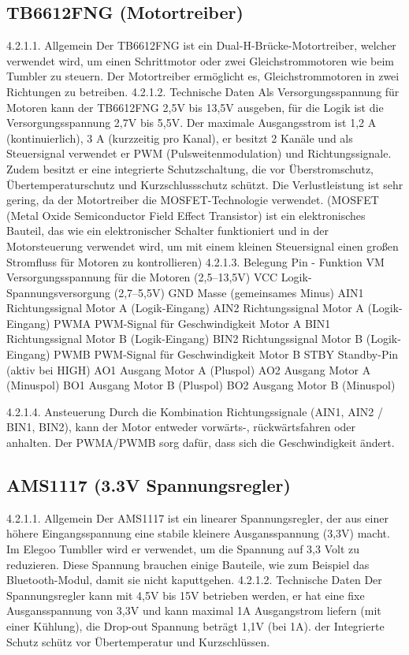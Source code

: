 \subsection{TB6612FNG (Motortreiber)}
%
4.2.1.1. Allgemein
Der TB6612FNG ist ein Dual-H-Brücke-Motortreiber, welcher verwendet wird, um einen Schrittmotor oder zwei Gleichstrommotoren wie beim Tumbler zu steuern. Der Motortreiber ermöglicht es, Gleichstrommotoren in zwei Richtungen zu betreiben.
4.2.1.2. Technische Daten
Als Versorgungsspannung für Motoren kann der TB6612FNG 2,5V bis 13,5V ausgeben, für die Logik ist die Versorgungsspannung 2,7V bis 5,5V. Der maximale Ausgangsstrom ist 1,2 A (kontinuierlich), 3 A (kurzzeitig pro Kanal), er besitzt 2 Kanäle und als Steuersignal verwendet er PWM (Pulsweitenmodulation) und Richtungssignale. Zudem besitzt er eine integrierte Schutzschaltung, die vor Überstromschutz, Übertemperaturschutz und Kurzschlussschutz schützt. Die Verlustleistung ist sehr gering, da der Motortreiber die MOSFET-Technologie verwendet. (MOSFET (Metal Oxide Semiconductor Field Effect Transistor) ist ein elektronisches Bauteil, das wie ein elektronischer Schalter funktioniert und in der Motorsteuerung verwendet wird, um mit einem kleinen Steuersignal einen großen Stromfluss für Motoren zu kontrollieren)
4.2.1.3. Belegung
Pin	-	Funktion
VM	Versorgungsspannung für die Motoren (2,5–13,5V)
VCC	Logik-Spannungsversorgung (2,7–5,5V)
GND	Masse (gemeinsames Minus)
AIN1	Richtungssignal Motor A (Logik-Eingang)
AIN2	Richtungssignal Motor A (Logik-Eingang)
PWMA	PWM-Signal für Geschwindigkeit Motor A
BIN1	Richtungssignal Motor B (Logik-Eingang)
BIN2	Richtungssignal Motor B (Logik-Eingang)
PWMB	PWM-Signal für Geschwindigkeit Motor B
STBY	Standby-Pin (aktiv bei HIGH)
AO1	Ausgang Motor A (Pluspol)
AO2	Ausgang Motor A (Minuspol)
BO1	Ausgang Motor B (Pluspol)
BO2	Ausgang Motor B (Minuspol)

4.2.1.4. Ansteuerung
Durch die Kombination Richtungssignale (AIN1, AIN2 / BIN1, BIN2), kann der Motor entweder vorwärts-, rückwärtsfahren oder anhalten.
Der PWMA/PWMB sorg dafür, dass sich die Geschwindigkeit ändert.
%
\subsection{AMS1117 (3.3V Spannungsregler)}
%
4.2.1.1. Allgemein
Der AMS1117 ist ein linearer Spannungsregler, der aus einer höhere Eingangsspannung eine stabile kleinere Ausgansspannung (3,3V) macht. Im Elegoo Tumbller wird er verwendet, um die Spannung auf 3,3 Volt zu reduzieren. Diese Spannung brauchen einige Bauteile, wie zum Beispiel das Bluetooth-Modul, damit sie nicht kaputtgehen.
4.2.1.2. Technische Daten
Der Spannungsregler kann mit 4,5V bis 15V betrieben werden, er hat eine fixe Ausgansspannung von 3,3V und kann maximal 1A Ausgangstrom liefern (mit einer Kühlung), die Drop-out Spannung beträgt 1,1V (bei 1A). der Integrierte Schutz schütz vor Übertemperatur und Kurzschlüssen.
%
